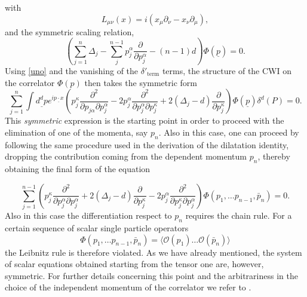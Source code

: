 \documentclass[a4paper,11pt,openright,twoside]{book}
\numberwithin{equation}{section}
\begin{document}
with 
\begin{equation}
	L_{\mu\nu}(x)=i\left(x_\mu\partial_\nu - x_\nu\partial_\mu \right),
\end{equation}
and the symmetric scaling relation,
\begin{equation}
	\left(\sum_{j=1}^n \Delta_j - \sum_j^{n-1} p_j^\alpha 
	\frac{\partial}{\partial p_j^\alpha} - (n-1) d \right)\Phi(\underline{p})=0.
\end{equation}
Using \eqref{uno} and the vanishing of the $\delta'_\textrm{term}$ terms, the structure of the CWI on the correlator $\Phi(p)$ then takes the symmetric form 
\begin{equation}
	\label{sm1}
	\sum_{j=1}^n \int \underline {d^d p}e^{i\underline{p\cdot x}}\left(p_j^\kappa \frac{\partial^2}{\partial p_{j\alpha} \partial p_j^\alpha} -
	2 p_j^\alpha \frac{\partial^2}{\partial p_j^\alpha \partial p_j^\kappa}  + 2( \Delta_j-d)\frac{\partial}{\partial p_j^\kappa}\right) 
	\Phi(\underline{p})\delta^d(P)=0.
\end{equation}
This {\em symmetric} expression is the starting point in order to proceed with the elimination of one of the momenta, say $p_n$. 
Also in this case, one can proceed by following the same procedure used in the derivation of the dilatation identity, dropping the contribution coming from the dependent momentum $p_n$, thereby obtaining the final form of the equation

\begin{equation}
	\sum_{j=1}^{n-1}\left(p_j^\kappa \frac{\partial^2}{\partial p_j^\alpha\partial p_j^\alpha} + 2(\Delta_j- d)\frac{\partial}{\partial p_j^\kappa}-2 p_j^\alpha\frac{\partial^2}{\partial p_j^\kappa \partial p_j^\alpha}\right)\Phi(p_1,\ldots p_{n-1},\bar{p}_n)=0.\label{SpCWIs}
\end{equation}
Also in this case the differentiation respect to $p_n$ requires the chain rule. For a certain sequence of scalar single particle operators 
\begin{equation}
	\Phi(p_1,\ldots p_{n-1},\bar{p}_n)=\langle \mathcal{O}(p_1)\ldots \mathcal{O} (\bar{p}_n)\rangle 
\end{equation}
the Leibnitz rule is therefore violated. As we have already mentioned, the system of scalar equations obtained starting from the tensor one are, however, symmetric. For further details 
concerning this point and the arbitrariness in the choice of the independent momentum of the correlator we refer to  \cite{Coriano:2018bbe}. 
\end{document}
